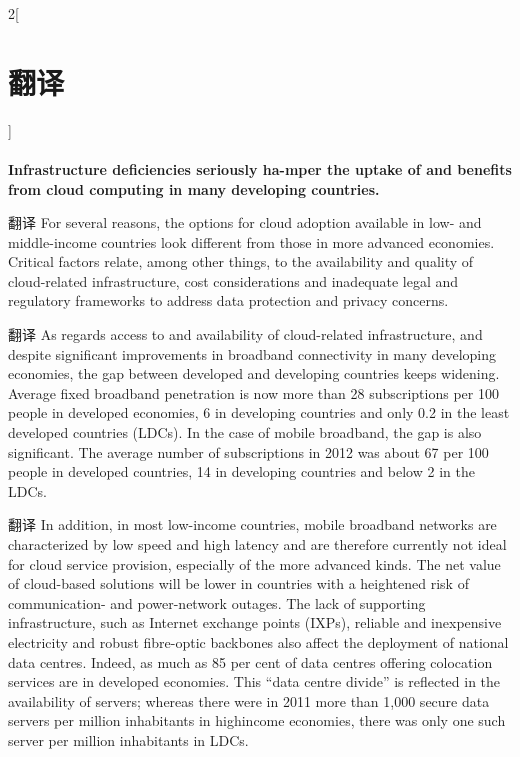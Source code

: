 \documentclass[a4paper, UTF8, 12pt]{article}
\begin{document}
\begin{paracol}{2}[\section{翻译}]
    \switchcolumn*
    \paragraph{} 
    \switchcolumn
    {\bfseries Infrastructure deficiencies seriously ha-mper the uptake of and benefits from cloud computing in many developing countries.}

    \switchcolumn*
    翻译
    \switchcolumn
    For several reasons, the options for cloud adoption available in low- and middle-income countries look different from those in more advanced economies. Critical factors relate, among other things, to the availability and quality of cloud-related infrastructure, cost considerations and inadequate legal and regulatory frameworks to address data protection and privacy concerns. 
    
    \switchcolumn*
    翻译
    \switchcolumn
    As regards access to and availability of cloud-related infrastructure, and despite significant improvements in broadband connectivity in many developing economies, the gap between developed and developing countries keeps widening. Average fixed broadband penetration is now more than 28 subscriptions per 100 people in developed economies, 6 in developing countries and only 0.2 in the least developed countries (LDCs). In the case of mobile broadband, the gap is also significant. The average number of subscriptions in 2012 was about 67 per 100 people in developed countries, 14 in developing countries and below 2 in the LDCs. 

    \switchcolumn*
    翻译
    \switchcolumn
    In addition, in most low-income countries, mobile broadband networks are characterized by low speed and high latency and are therefore currently not ideal for cloud service provision, especially of the more advanced kinds. The net value of cloud-based solutions will be lower in countries with a heightened risk of communication- and power-network outages. The lack of supporting infrastructure, such as Internet exchange points (IXPs), reliable and inexpensive electricity and robust fibre-optic backbones also affect the deployment of national data centres. Indeed, as much as 85 per cent of data centres offering colocation services are in developed economies. This “data centre divide” is reflected in the availability of servers; whereas there were in 2011 more than 1,000 secure data servers per million inhabitants in highincome economies, there was only one such server per million inhabitants in LDCs.


\end{paracol}
\end{document}
